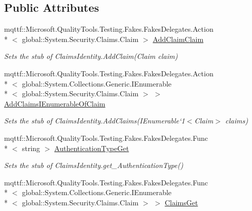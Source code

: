 \subsection*{Public Attributes}
\begin{DoxyCompactItemize}
\item 
mqttf\-::\-Microsoft.\-Quality\-Tools.\-Testing.\-Fakes.\-Fakes\-Delegates.\-Action\\*
$<$ global\-::\-System.\-Security.\-Claims.\-Claim $>$ \hyperlink{class_system_1_1_security_1_1_claims_1_1_fakes_1_1_stub_claims_identity_a8e97bf3ea7bfa11897cd8e86224c5be0}{Add\-Claim\-Claim}
\begin{DoxyCompactList}\small\item\em Sets the stub of Claims\-Identity.\-Add\-Claim(\-Claim claim)\end{DoxyCompactList}\item 
mqttf\-::\-Microsoft.\-Quality\-Tools.\-Testing.\-Fakes.\-Fakes\-Delegates.\-Action\\*
$<$ global\-::\-System.\-Collections.\-Generic.\-I\-Enumerable\\*
$<$ global\-::\-System.\-Security.\-Claims.\-Claim $>$ $>$ \hyperlink{class_system_1_1_security_1_1_claims_1_1_fakes_1_1_stub_claims_identity_a3bac0eb870f33a93ccd0e4724533e751}{Add\-Claims\-I\-Enumerable\-Of\-Claim}
\begin{DoxyCompactList}\small\item\em Sets the stub of Claims\-Identity.\-Add\-Claims(I\-Enumerable`1$<$Claim$>$ claims)\end{DoxyCompactList}\item 
mqttf\-::\-Microsoft.\-Quality\-Tools.\-Testing.\-Fakes.\-Fakes\-Delegates.\-Func\\*
$<$ string $>$ \hyperlink{class_system_1_1_security_1_1_claims_1_1_fakes_1_1_stub_claims_identity_a4ff6555093d4cae7501a931b567dfecf}{Authentication\-Type\-Get}
\begin{DoxyCompactList}\small\item\em Sets the stub of Claims\-Identity.\-get\-\_\-\-Authentication\-Type()\end{DoxyCompactList}\item 
mqttf\-::\-Microsoft.\-Quality\-Tools.\-Testing.\-Fakes.\-Fakes\-Delegates.\-Func\\*
$<$ global\-::\-System.\-Collections.\-Generic.\-I\-Enumerable\\*
$<$ global\-::\-System.\-Security.\-Claims.\-Claim $>$ $>$ \hyperlink{class_system_1_1_security_1_1_claims_1_1_fakes_1_1_stub_claims_identity_af004fd5271ec695e66c4cae96829f9e8}{Claims\-Get}

\end{DoxyCompactItemize}
